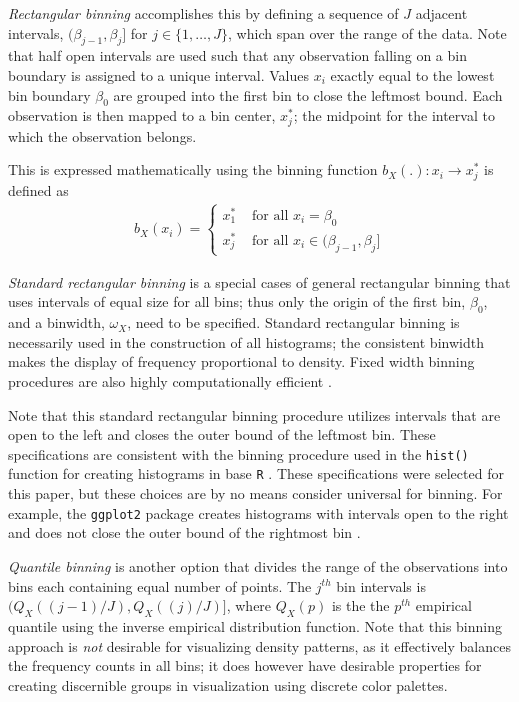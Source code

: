 \textit{Rectangular binning} accomplishes this by defining a sequence of $J$ adjacent intervals, $(\beta_{j-1},\beta_{j}]$ for $j \in \{1,\dots,J\}$, which span over the range of the data. Note that half open intervals are used such that any observation falling on a bin boundary is assigned to a unique interval. Values $x_i$ exactly equal to the lowest bin boundary $\beta_0$ are grouped into the first bin to close the leftmost bound. Each observation is then mapped to a bin center, $x_j^\ast$; the midpoint for the interval to which the observation belongs. 

This is expressed mathematically using the binning function $b_X(.) : x_i \rightarrow x^\ast_j$ is defined as 
%
\begin{eqnarray}\label{rectbin}
b_X(x_i) = \left\{\begin{array}{ll} 
  x^\ast_{1} &\text{ for all } x_i = \beta_{0} \\
  x^\ast_j & \text{ for all } x_i \in (\beta_{j-1} , \beta_j] 
  \end{array}\right.
\end{eqnarray}  
%

\textit{Standard rectangular binning} is a special cases of general rectangular binning that uses intervals of equal size for all bins; thus only the origin of the first bin, $\beta_0$, and a binwidth, $\omega_X$, need to be specified. Standard rectangular binning is necessarily used in the construction of all histograms;  the consistent binwidth makes the display of frequency proportional to density. Fixed width binning procedures are also highly computationally efficient \citep{Wickham2013Bin}. 

Note that this standard rectangular binning procedure utilizes intervals that are open to the left and closes the outer bound of the leftmost bin. These specifications are consistent with the binning procedure used in the \texttt{hist()} function for creating histograms in base \texttt{R} \citep{R}. These specifications were selected for this paper, but these choices are by no means consider universal for binning.  For example, the \texttt{ggplot2} package creates histograms with intervals open to the right and does not close the outer bound of the rightmost bin \citep{ggplot2}. 

\textit{Quantile binning} is another option that divides the range of the observations into bins each containing equal number of points. The $j^{th}$ bin intervals is $(Q_X((j-1)/J),Q_X((j)/J)]$, where $Q_X(p)$ is the the $p^{th}$ empirical quantile using the inverse empirical distribution function. Note that this binning approach is \textit{not} desirable for visualizing density patterns, as it effectively balances the frequency counts in all bins; it does however have desirable properties for creating discernible groups in visualization using discrete color palettes.
  
